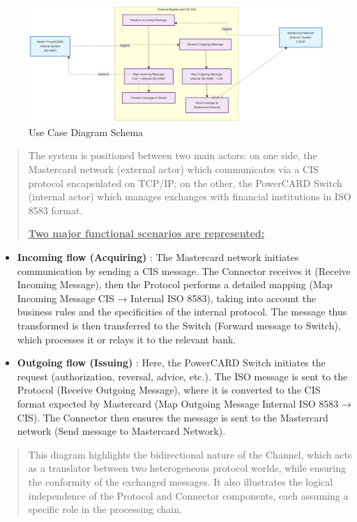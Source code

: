 \documentclass[12pt,a4paper]{report}
\begin{document}
\begin{figure}[H]
\centering
\includegraphics[width=7in]{media/image35.png}
\caption{Use Case Diagram Schema}
\label{fig:UseCaseD}
\end{figure}


\begin{quote}
The system is positioned between two main actors: on one side, the
Mastercard network (external actor) which communicates via a CIS
protocol encapsulated on TCP/IP; on the other, the PowerCARD Switch
(internal actor) which manages exchanges with financial institutions in
ISO 8583 format.

\textbf{\uline{Two major functional scenarios are represented:}}
\end{quote}

\begin{itemize}
\item
  \textbf{Incoming flow (Acquiring)} : The Mastercard network initiates
  communication by sending a CIS message. The Connector receives it
  (Receive Incoming Message), then the Protocol performs a detailed
  mapping (Map Incoming Message CIS → Internal ISO 8583), taking into
  account the business rules and the specificities of the internal
  protocol. The message thus transformed is then transferred to the
  Switch (Forward message to Switch), which processes it or relays it to
  the relevant bank.
\item
  \textbf{Outgoing flow (Issuing)} : Here, the PowerCARD Switch
  initiates the request (authorization, reversal, advice, etc.). The ISO
  message is sent to the Protocol (Receive Outgoing Message), where it
  is converted to the CIS format expected by Mastercard (Map Outgoing
  Message Internal ISO 8583 → CIS). The Connector then ensures the
  message is sent to the Mastercard network (Send message to Mastercard
  Network).
\end{itemize}

\begin{quote}
This diagram highlights the bidirectional nature of the Channel, which
acts as a translator between two heterogeneous protocol worlds, while
ensuring the conformity of the exchanged messages. It also illustrates
the logical independence of the Protocol and Connector components, each
assuming a specific role in the processing chain.
\end{quote}
\end{document}
